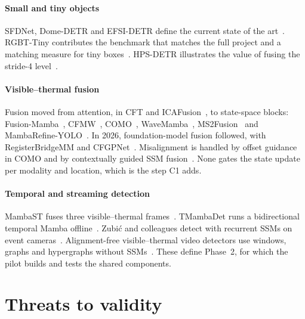 \documentclass[11pt,a4paper]{article}
\begin{document}
\paragraph{Small and tiny objects}
SFDNet, Dome-DETR and EFSI-DETR define the current state of the
art~\citep{sfdnet2026,domedetr2025,efsidetr2026}. RGBT-Tiny contributes the
benchmark that matches the full project and a matching measure for tiny
boxes~\citep{ying2025rgbttiny}. HPS-DETR illustrates the value of fusing the stride-4
level~\citep{wang2025hpsdetr}.

\paragraph{Visible--thermal fusion}
Fusion moved from attention, in CFT and ICAFusion~\citep{qingyun2021cft,shen2024icafusion},
to state-space blocks:
Fusion-Mamba~\citep{dong2025fusionmamba}, CFMW~\citep{li2025cfmw},
COMO~\citep{como2024}, WaveMamba~\citep{wavemamba2025},
MS2Fusion~\citep{ms2fusion2025} and MambaRefine-YOLO~\citep{mambarefine2025}. In 2026,
foundation-model fusion followed, with RegisterBridgeMM and
CFGPNet~\citep{registerbridge2026,cfgpnet2026}. Misalignment is handled by offset
guidance in COMO and by contextually guided SSM fusion~\citep{como2024,cgssm2025}.
None gates the state update per modality and location, which is the step C1 adds.

\paragraph{Temporal and streaming detection}
MambaST fuses three visible--thermal frames~\citep{mambast2024}. TMambaDet runs a
bidirectional temporal Mamba offline~\citep{tmambadet2026}. Zubi\'c and colleagues
detect with recurrent SSMs on event cameras~\citep{zubic2024ssmevent}.
Alignment-free visible--thermal video detectors use windows, graphs and hypergraphs
without SSMs~\citep{msenet2024,msgnet2025,dchnet2026}. These define Phase~2, for which
the pilot builds and tests the shared components.

\section{Threats to validity}
\end{document}
